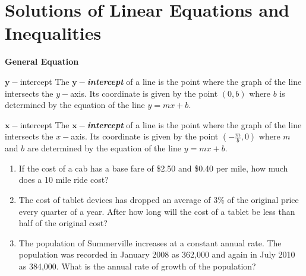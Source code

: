 \section[Linear Equations]{Solutions of Linear Equations and Inequalities}

\textbf{General Equation}

\bigskip
\begin{multicols}{2}
\setlength{\columnseprule}{0pt}
\begin{equationbox}{$\boldsymbol{y-}$intercept}
The \textit{\bfseries $\boldsymbol{y-}$intercept} of a line is the point where the graph of the line intersects the $y-$axis. Its coordinate is given by the point $(0, b)$ where $b$ is determined by the equation of the line $y=mx+b$.

\phantom{}
\end{equationbox}

\begin{equationbox}{$\boldsymbol{x-}$intercept}
The \textit{\bfseries $\boldsymbol{x-}$intercept} of a line is the point where the graph of the line intersects the $x-$axis. Its coordinate is given by the point $\left(-\frac{m}{b},0\right)$ where $m$ and $b$ are determined by the equation of the line $y=mx+b$.
\end{equationbox}
\end{multicols}

\bigskip
\begin{enumerate}[labelindent=*,style=multiline,leftmargin=*,label=\textbf{Example \arabic*:}]
\item If the cost of a cab has a base fare of \$2.50 and \$0.40 per mile, how much does a 10 mile ride cost?

\vfill\item The cost of tablet devices has dropped an average of 3\% of the original price every quarter of a year. After how long will the cost of a tablet be less than half of the original cost?

\vfill\item The population of Summerville increases at a constant annual rate. The population was recorded in January 2008 as 362,000 and again in July 2010 as 384,000. What is the annual rate of growth of the population?
\end{enumerate}

